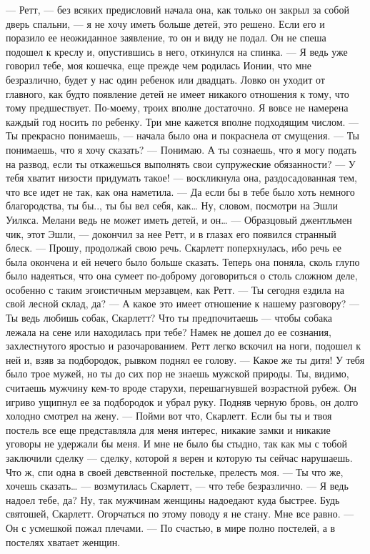 — Ретт, — без всяких предисловий начала она, как только он закрыл за собой дверь спальни, — я не хочу иметь больше детей, это решено.
Если его и поразило ее неожиданное заявление, то он и виду не подал. Он не спеша подошел к креслу и, опустившись в него, откинулся на спинка.
— Я ведь уже говорил тебе, моя кошечка, еще прежде чем родилась Ионии, что мне безразлично, будет у нас один ребенок или двадцать.
Ловко он уходит от главного, как будто появление детей не имеет никакого отношения к тому, что тому предшествует.
По-моему, троих вполне достаточно. Я вовсе не намерена каждый год носить по ребенку.
Три мне кажется вполне подходящим числом.
— Ты прекрасно понимаешь, — начала было она и покраснела от смущения. — Ты понимаешь, что я хочу сказать?
— Понимаю. А ты сознаешь, что я могу подать на развод, если ты откажешься выполнять свои супружеские обязанности?
— У тебя хватит низости придумать такое! — воскликнула она, раздосадованная тем, что все идет не так, как она наметила. — Да если бы в тебе было хоть немного благородства, ты бы.., ты бы вел себя, как… Ну, словом, посмотри на Эшли Уилкса. Мелани ведь не может иметь детей, и он…
— Образцовый джентльмен чик, этот Эшли, — докончил за нее Ретт, и в глазах его появился странный блеск. — Прошу, продолжай свою речь.
Скарлетт поперхнулась, ибо речь ее была окончена и ей нечего было больше сказать. Теперь она поняла, сколь глупо было надеяться, что она сумеет по-доброму договориться о столь сложном деле, особенно с таким эгоистичным мерзавцем, как Ретт.
— Ты сегодня ездила на свой лесной склад, да?
— А какое это имеет отношение к нашему разговору?
— Ты ведь любишь собак, Скарлетт? Что ты предпочитаешь — чтобы собака лежала на сене или находилась при тебе?
Намек не дошел до ее сознания, захлестнутого яростью и разочарованием.
Ретт легко вскочил на ноги, подошел к ней и, взяв за подбородок, рывком поднял ее голову.
— Какое же ты дитя! У тебя было трое мужей, но ты до сих пор не знаешь мужской природы. Ты, видимо, считаешь мужчину кем-то вроде старухи, перешагнувшей возрастной рубеж.
Он игриво ущипнул ее за подбородок и убрал руку. Подняв черную бровь, он долго холодно смотрел на жену.
— Пойми вот что, Скарлетт. Если бы ты и твоя постель все еще представляла для меня интерес, никакие замки и никакие уговоры не удержали бы меня. И мне не было бы стыдно, так как мы с тобой заключили сделку — сделку, которой я верен и которую ты сейчас нарушаешь. Что ж, спи одна в своей девственной постельке, прелесть моя.
— Ты что же, хочешь сказать… — возмутилась Скарлетт, — что тебе безразлично.
— Я ведь надоел тебе, да? Ну, так мужчинам женщины надоедают куда быстрее. Будь святошей, Скарлетт. Огорчаться по этому поводу я не стану. Мне все равно. — Он с усмешкой пожал плечами. — По счастью, в мире полно постелей, а в постелях хватает женщин.
